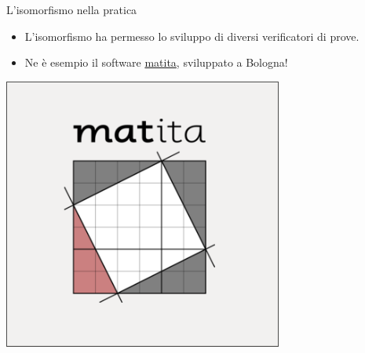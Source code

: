 \documentclass{beamer}
\begin{document}
\begin{frame}{L'isomorfismo nella pratica}
\begin{itemize}
  \item L'isomorfismo ha permesso lo sviluppo di diversi verificatori di prove.
  \item Ne è esempio il software \alert{\href{https://github.com/sacerdot/matita}{matita}}, sviluppato a Bologna! 
\end{itemize}
\begin{center}
\includegraphics[scale=0.50]{7.png}
\end{center}
\end{frame}
\end{document}
